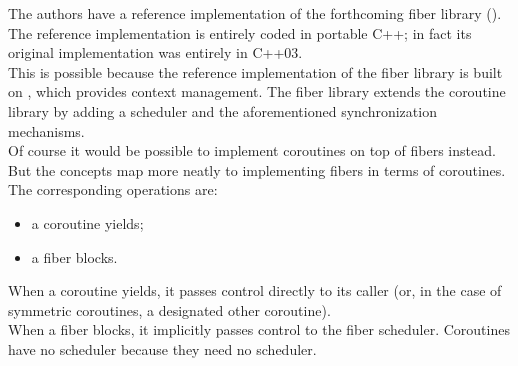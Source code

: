 The authors have a reference implementation of the forthcoming fiber library
(\boostfiber). The reference implementation is entirely
coded in portable C++; in fact its original implementation was entirely in
C++03.\\
\newline
This is possible because the reference implementation of the fiber library is
built on \boostcoroutine, which provides context management. The fiber library
extends the coroutine library by adding a scheduler and the aforementioned
synchronization mechanisms.\\
\newline
Of course it would be possible to implement coroutines on top of fibers
instead. But the concepts map more neatly to implementing fibers in terms of
coroutines. The corresponding operations are:\\

\begin{itemize}
    \item a coroutine yields;
    \item a fiber blocks.
\end{itemize}

When a coroutine yields, it passes control directly to its caller (or, in the
case of symmetric coroutines, a designated other coroutine).\\
\newline
When a fiber blocks, it implicitly passes control to the fiber scheduler.
Coroutines have no scheduler because they need no scheduler.
